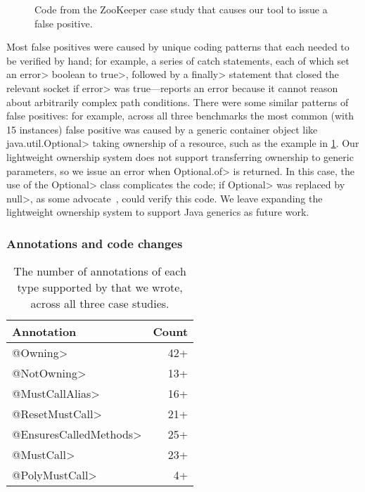 \begin{figure}
  
  \caption{Code from the ZooKeeper case study that causes our tool
  to issue a false positive.}
  \label{fig:zookeeper-optional}
\end{figure}

Most false positives were caused by unique coding patterns that
each needed to be verified by hand; for example, a series of catch
statements, each of which set an \<error> boolean to \<true>, followed
by a \<finally> statement that closed the relevant socket if \<error>
was true---\Tool reports an error because it cannot reason about arbitrarily
complex path conditions. There were some similar patterns of false positives:
for example, across all three benchmarks the most common (with 15 instances) false
positive was caused by
a generic container object like \<java.util.Optional> taking ownership of a resource, such
as the example in \cref{fig:zookeeper-optional}. Our lightweight ownership
system does not support transferring ownership to generic parameters,
so we issue an error when \<Optional.of> is returned. In this case, the use
of the \<Optional> class complicates the code; if \<Optional> was replaced
by \<null>, as some advocate~\cite{ErnstNothingIsBetterThanOptional},
\Tool could verify this code. We leave expanding the lightweight ownership system to
support Java generics as future work.

\subsubsection{Annotations and code changes}
\label{sec:annos}

\begin{table}
  \caption{The number of annotations of each
    type supported by \Tool that we wrote, across all
    three case studies.}
  \label{tab:annos}
  \begin{tabularx}{\columnwidth}{@{}Xr@{}}
    Annotation          &      Count     \\
    \hline
    \<@Owning>          &      42+      \\
    \<@NotOwning>       &      13+       \\
    \<@MustCallAlias>   &      16+       \\
    \<@ResetMustCall>   &      21+      \\
    \<@EnsuresCalledMethods> & 25+      \\
    \<@MustCall>        &      23+      \\
    \<@PolyMustCall>    &      4+       \\
  \end{tabularx}
\end{table}

